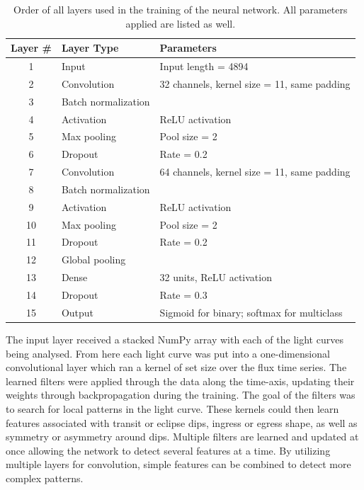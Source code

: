 \begin{table}[h]
    \centering
    \small
    \begin{tabularx}{\textwidth}{c l X}
        \toprule
        Layer \# & Layer Type & Parameters \\
        \midrule
        1 & Input & Input length = 4894 \\
        2 & Convolution & 32 channels, kernel size = 11, same padding \\
        3 & Batch normalization & \\
        4 & Activation & ReLU activation \\
        5 & Max pooling & Pool size = 2 \\
        6 & Dropout & Rate = 0.2 \\
        7 & Convolution & 64 channels, kernel size = 11, same padding \\
        8 & Batch normalization & \\
        9 & Activation & ReLU activation \\
        10 & Max pooling & Pool size = 2 \\
        11 & Dropout & Rate = 0.2 \\
        12 & Global pooling & \\
        13 & Dense & 32 units, ReLU activation \\
        14 & Dropout & Rate = 0.3 \\
        15 & Output & Sigmoid for binary; softmax for multiclass \\
        \bottomrule
    \end{tabularx}
    \caption{Order of all layers used in the training of the neural network. All parameters applied are listed as well.}
    \label{tab:layer_order}
\end{table}

The input layer received a stacked NumPy array with each of the light curves being analysed. From here each light curve was put into a one-dimensional convolutional layer which ran a kernel of set size over the flux time series. The learned filters were applied through the data along the time-axis, updating their weights through backpropagation during the training. The goal of the filters was to search for local patterns in the light curve. These kernels could then learn features associated with transit or eclipse dips, ingress or egress shape, as well as symmetry or asymmetry around dips. Multiple filters are learned and updated at once allowing the network to detect several features at a time. By utilizing multiple layers for convolution, simple features can be combined to detect more complex patterns.

